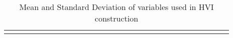 
\begin{table}[!htbp] \centering 
  \caption{Mean and Standard Deviation of variables used in HVI construction} 
  \label{} 
\begin{tabular}{@{\extracolsep{5pt}} D{.}{.}{-3} D{.}{.}{-3} D{.}{.}{-3} D{.}{.}{-3} D{.}{.}{-3} D{.}{.}{-3} D{.}{.}{-3} D{.}{.}{-3} D{.}{.}{-3} D{.}{.}{-3} D{.}{.}{-3} D{.}{.}{-3} D{.}{.}{-3} D{.}{.}{-3} D{.}{.}{-3} D{.}{.}{-3} D{.}{.}{-3} D{.}{.}{-3} D{.}{.}{-3} D{.}{.}{-3} D{.}{.}{-3} D{.}{.}{-3} D{.}{.}{-3} D{.}{.}{-3} D{.}{.}{-3} D{.}{.}{-3} D{.}{.}{-3} D{.}{.}{-3} } 
\\[-1.8ex]\hline 
\hline \\[-1.8ex] 

\end{tabular}
\end{table}
